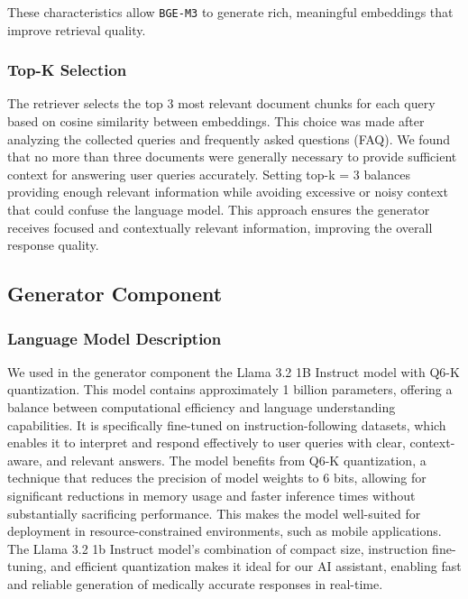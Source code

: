 These characteristics allow \texttt{BGE-M3} to generate rich, meaningful embeddings that improve retrieval quality.

\subsubsection*{Top-K Selection}
The retriever selects the top 3 most relevant document chunks for each query based on cosine similarity between embeddings. This choice was made after analyzing the collected queries and frequently asked questions (FAQ). We found that no more than three documents were generally necessary to provide sufficient context for answering user queries accurately. Setting top-k = 3 balances providing enough relevant information while avoiding excessive or noisy context that could confuse the language model.
This approach ensures the generator receives focused and contextually relevant information, improving the overall response quality.

\subsection{Generator Component}
\label{subsec:generator}

\subsubsection{Language Model Description}
\label{sssec:lm-description}

We used in the generator component the Llama 3.2 1B Instruct model with Q6-K quantization. This model contains approximately 1 billion parameters, offering a balance between computational efficiency and language understanding capabilities. It is specifically fine-tuned on instruction-following datasets, which enables it to interpret and respond effectively to user queries with clear, context-aware, and relevant answers.
The model benefits from Q6-K quantization, a technique that reduces the precision of model weights to 6 bits, allowing for significant reductions in memory usage and faster inference times without substantially sacrificing performance. This makes the model well-suited for deployment in resource-constrained environments, such as mobile applications.
The Llama 3.2 1b Instruct model’s combination of compact size, instruction fine-tuning, and efficient quantization makes it ideal for our AI assistant, enabling fast and reliable generation of medically accurate responses in real-time.


